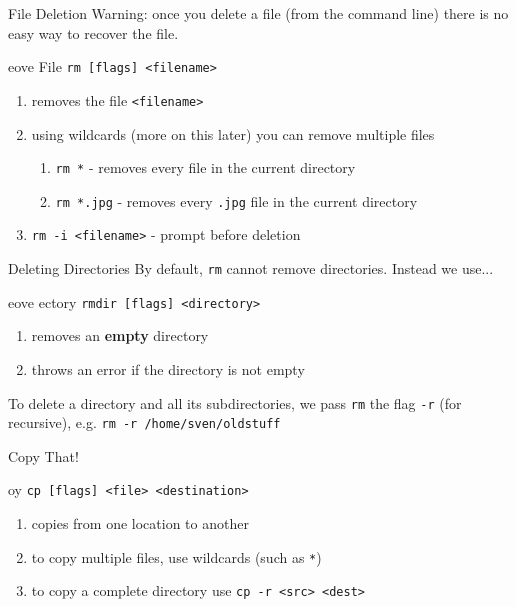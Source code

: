 \begin{frame}[fragile]{File Deletion}
  Warning: once you delete a file (from the command line) there is no easy way to recover the file.

  \begin{block}{eove File}
    \texttt{rm [flags] <filename>}
    \begin{enumerate}[\--]
      \item removes the file \texttt{<filename>}
      \item using wildcards (more on this later) you can remove multiple files
      \begin{enumerate}[\--]
        \item \texttt{rm *} \-- removes every file in the current directory
        \item \texttt{rm *.jpg} \-- removes every \texttt{.jpg} file in the current directory
      \end{enumerate}
      \item \texttt{rm -i <filename>} \-- prompt before deletion
    \end{enumerate}
    \vspace*{1em}
  \end{block}
\end{frame}

\begin{frame}[fragile]{Deleting Directories}
  By default, \texttt{rm} cannot remove directories. Instead we use...

  \begin{block}{eove ectory}
    \texttt{rmdir [flags] <directory>}
    \begin{enumerate}[\--]
      \item removes an \textbf{empty} directory
      \item throws an error if the directory is not empty
    \end{enumerate}
    \vspace*{1em}
  \end{block}

  To delete a directory and all its subdirectories, we pass \texttt{rm} the flag \texttt{-r} (for recursive),
  e.g. \texttt{rm -r /home/sven/oldstuff}
\end{frame}

\begin{frame}[fragile]{Copy That!}
  \begin{block}{oy}
    \texttt{cp [flags] <file> <destination>}
    \begin{enumerate}[\--]
      \item copies from one location to another
      \item to copy multiple files, use wildcards (such as \texttt{*})
      \item to copy a complete directory use \texttt{cp -r <src> <dest>}
    \end{enumerate}
    \vspace*{1em}
  \end{block}
\end{frame}

